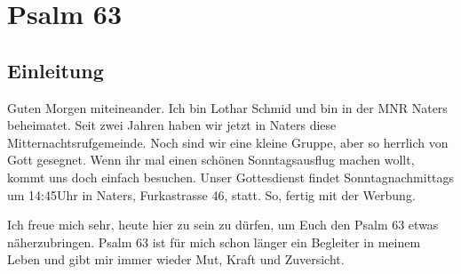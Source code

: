 \documentclass[fontsize=16pt]{mybib}
\author{OTS}
\author{Lothar Schmid}
\begin{document}
\section*{Psalm 63}
    \subsection*{Einleitung}
    Guten Morgen miteineander. Ich bin Lothar Schmid und bin in der MNR Naters beheimatet. Seit zwei Jahren haben wir jetzt in Naters diese Mitternachtsrufgemeinde. Noch sind wir eine kleine Gruppe, aber so herrlich von Gott gesegnet. Wenn ihr mal einen schönen Sonntagsausflug machen wollt, kommt uns doch einfach besuchen. Unser Gottesdienst findet Sonntagnachmittags um 14:45Uhr in Naters, Furkastrasse 46, statt. So, fertig mit der Werbung.
    
    Ich freue mich sehr, heute hier zu sein zu dürfen, um Euch den Psalm 63 etwas näherzubringen. Psalm 63 ist für mich schon länger ein Begleiter in meinem Leben und gibt mir immer wieder Mut, Kraft und Zuversicht. 
\end{document}
